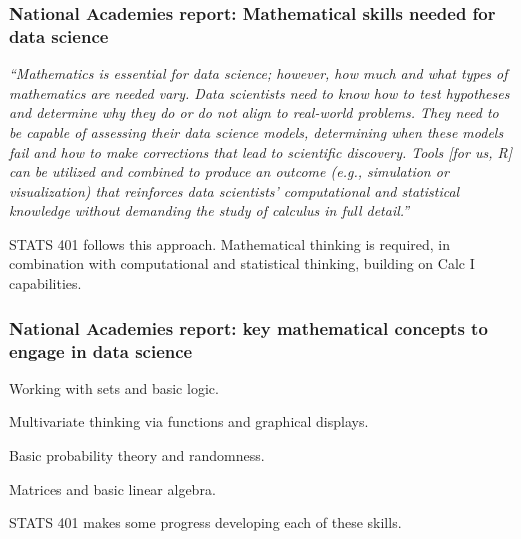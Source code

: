 \documentclass{beamer}
\begin{document}

\begin{frame}
  \frametitle{National Academies report: Mathematical skills needed for data science}

  \begin{myitemize}
    
\item %
{\it ``Mathematics is essential for data science; however, how much and what types of mathematics are needed vary. Data scientists need to know how to test hypotheses and determine why they do or do not align to real-world problems. They need to be capable of assessing their data science models, determining when these models fail and how to make corrections that lead to scientific discovery. Tools [for us, R] can be utilized and combined to produce an outcome (e.g., simulation or visualization) that reinforces data scientists’ computational and statistical knowledge without demanding the study of calculus in full detail.''}

\item STATS 401 follows this approach. Mathematical thinking is required, in combination with computational and statistical thinking, building on Calc I capabilities.
  \end{myitemize}
\end{frame}

\begin{frame}
  \frametitle{National Academies report: key mathematical concepts to engage in data science}
  
  \begin{myitemize}
\item Working with sets and basic logic.
\item Multivariate thinking via functions and graphical displays.
\item Basic probability theory and randomness.
\item Matrices and basic linear algebra.
  \end{myitemize}

  \vspace{8mm}
  
  STATS 401 makes some progress developing each of these skills.
  
\end{frame}
\end{document}
